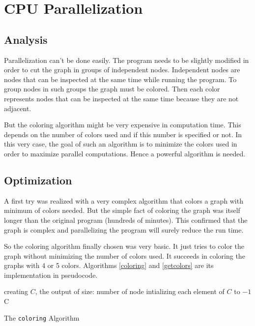 \documentclass[fleqn,11pt]{SelfArx} %
\theoremstyle{definition}
\begin{document}

\section{CPU Parallelization}

\subsection{Analysis}

Parallelization can't be done easily. The program needs to be slightly modified in order to cut the graph in groups of independent nodes. Independent nodes are nodes that can be inspected at the same time while running the program. To group nodes in such groups the graph must be colored. Then each color represents nodes that can be inspected at the same time because they are not adjacent.

But the coloring algorithm might be very expensive in computation time. This depends on the number of colors used and if this number is specified or not. In this very case, the goal of such an algorithm is to minimize the colors used in order to maximize parallel computations. Hence a powerful algorithm is needed.

\subsection{Optimization}

A first try was realized with a very complex algorithm that colors a graph with minimum of colors needed. But the simple fact of coloring the graph was itself longer than the original program (hundreds of minutes). This confirmed that the graph is complex and parallelizing the program will surely reduce the run time.

So the coloring algorithm finally chosen was very basic. It just tries to color the graph without minimizing the number of colors used. It succeeds in coloring the graphs with 4 or 5 colors. Algorithms \ref{coloring} and \ref{getcolors} are its implementation in pseudocode.

\begin{algorithm}[h]

\BlankLine

creating $C$, the output of size: number of node\;
intializing each element of $C$ to $-1$\;
\Return C\;

\caption{The \texttt{coloring} Algorithm}
\label{coloring}
\end{algorithm}
\end{document}
